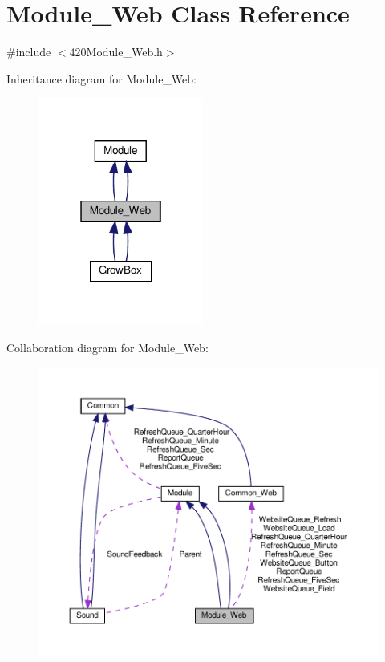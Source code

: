 \hypertarget{class_module___web}{}\section{Module\+\_\+\+Web Class Reference}
\label{class_module___web}


{\ttfamily \#include $<$420\+Module\+\_\+\+Web.\+h$>$}



Inheritance diagram for Module\+\_\+\+Web\+:
\nopagebreak
\begin{figure}[H]
\begin{center}
\leavevmode
\includegraphics[width=154pt]{class_module___web__inherit__graph}
\end{center}
\end{figure}


Collaboration diagram for Module\+\_\+\+Web\+:
\nopagebreak
\begin{figure}[H]
\begin{center}
\leavevmode
\includegraphics[width=350pt]{class_module___web__coll__graph}
\end{center}
\end{figure}
